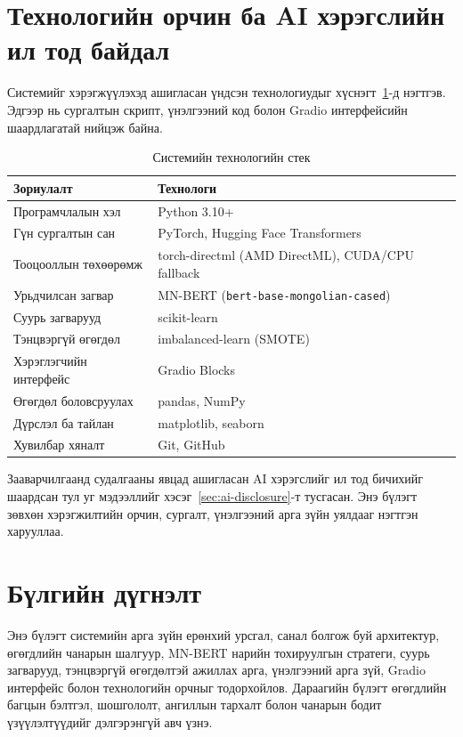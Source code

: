 \section{Технологийн орчин ба AI хэрэгслийн ил тод байдал}

Системийг хэрэгжүүлэхэд ашигласан үндсэн технологиудыг хүснэгт~\ref{tab:tech-stack}-д
нэгтгэв. Эдгээр нь сургалтын скрипт, үнэлгээний код болон Gradio интерфейсийн
шаардлагатай нийцэж байна.

\begin{table}[H]
\centering
\caption{Системийн технологийн стек}
\label{tab:tech-stack}
\begin{tabular}{@{}ll@{}}
\toprule
\textbf{Зориулалт} & \textbf{Технологи} \\
\midrule
Програмчлалын хэл        & Python 3.10+ \\
Гүн сургалтын сан        & PyTorch, Hugging Face Transformers \\
Тооцооллын төхөөрөмж     & torch-directml (AMD DirectML), CUDA/CPU fallback \\
Урьдчилсан загвар        & MN-BERT (\texttt{bert-base-mongolian-cased}) \\
Суурь загварууд          & scikit-learn \cite{pedregosa2011} \\
Тэнцвэргүй өгөгдөл       & imbalanced-learn (SMOTE) \\
Хэрэглэгчийн интерфейс   & Gradio Blocks \\
Өгөгдөл боловсруулах     & pandas, NumPy \\
Дүрслэл ба тайлан        & matplotlib, seaborn \\
Хувилбар хяналт          & Git, GitHub \\
\bottomrule
\end{tabular}
\end{table}

Зааварчилгаанд судалгааны явцад ашигласан AI хэрэгслийг ил тод бичихийг
шаардсан тул уг мэдээллийг хэсэг~\ref{sec:ai-disclosure}-т тусгасан. Энэ
бүлэгт зөвхөн хэрэгжилтийн орчин, сургалт, үнэлгээний арга зүйн
уялдааг нэгтгэн харууллаа.

\section{Бүлгийн дүгнэлт}

Энэ бүлэгт системийн арга зүйн ерөнхий урсгал, санал болгож буй архитектур,
өгөгдлийн чанарын шалгуур, MN-BERT нарийн тохируулгын стратеги, суурь загварууд,
тэнцвэргүй өгөгдөлтэй ажиллах арга, үнэлгээний арга зүй, Gradio интерфейс болон
технологийн орчныг тодорхойлов. Дараагийн бүлэгт өгөгдлийн багцын бэлтгэл,
шошгололт, ангиллын тархалт болон чанарын бодит үзүүлэлтүүдийг дэлгэрэнгүй
авч үзнэ.
